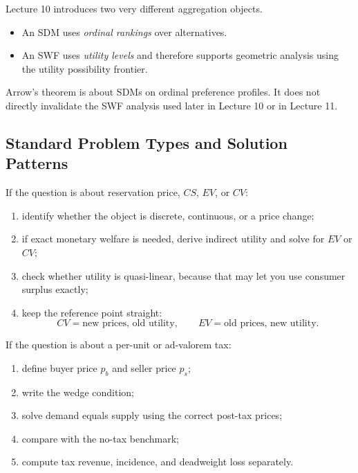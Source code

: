 Lecture 10 introduces two very different aggregation objects.

\begin{itemize}
    \item An SDM uses \emph{ordinal rankings} over alternatives.
    \item An SWF uses \emph{utility levels} and therefore supports geometric analysis using the utility possibility frontier.
\end{itemize}

Arrow's theorem is about SDMs on ordinal preference profiles. It does not directly invalidate the SWF analysis used later in Lecture 10 or in Lecture 11.

\subsection{Standard Problem Types and Solution Patterns}

\begin{examtip}[title={Method Pattern: Welfare-measure questions}]
If the question is about reservation price, \(CS\), \(EV\), or \(CV\):
\begin{enumerate}
    \item identify whether the object is discrete, continuous, or a price change;
    \item if exact monetary welfare is needed, derive indirect utility and solve for \(EV\) or \(CV\);
    \item check whether utility is quasi-linear, because that may let you use consumer surplus exactly;
    \item keep the reference point straight:
    \[
    CV=\text{new prices, old utility},
    \qquad
    EV=\text{old prices, new utility}.
    \]
\end{enumerate}
\end{examtip}

\begin{examtip}[title={Method Pattern: Tax and deadweight-loss questions}]
If the question is about a per-unit or ad-valorem tax:
\begin{enumerate}
    \item define buyer price \(p_b\) and seller price \(p_s\);
    \item write the wedge condition;
    \item solve demand equals supply using the correct post-tax prices;
    \item compare with the no-tax benchmark;
    \item compute tax revenue, incidence, and deadweight loss separately.
\end{enumerate}
\end{examtip}

